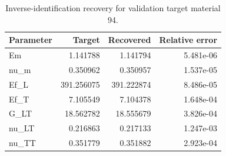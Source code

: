 \begin{table}
\centering
\small
\caption{Inverse-identification recovery for validation target material 94.}
\label{tab:inverse}
\begin{tabular}{lrrr}
\toprule
Parameter & Target & Recovered & Relative error \\
\midrule
Em & 1.141788 & 1.141794 & 5.481e-06 \\
nu\_m & 0.350962 & 0.350957 & 1.537e-05 \\
Ef\_L & 391.256075 & 391.222874 & 8.486e-05 \\
Ef\_T & 7.105549 & 7.104378 & 1.648e-04 \\
G\_LT & 18.562782 & 18.555679 & 3.826e-04 \\
nu\_LT & 0.216863 & 0.217133 & 1.247e-03 \\
nu\_TT & 0.351779 & 0.351882 & 2.923e-04 \\
\bottomrule
\end{tabular}
\end{table}
